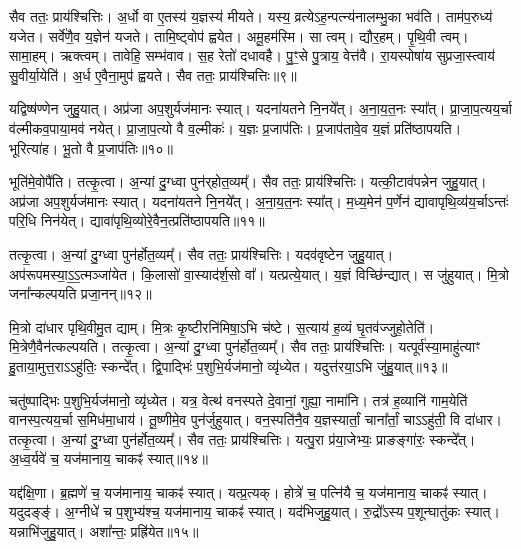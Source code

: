सैव ततः॒ प्राय॑श्चित्तिः।
अ॒र्धो वा ए॒तस्य॑ य॒ज्ञस्य॑ मीयते।
यस्य॒ व्रत्ये\-ऽह॒न्पत्न्य॑नालम्भु॒का भव॑ति।
ताम॑प॒रुध्य॑ यजेत।
सर्वे॑णै॒व य॒ज्ञेन॑ यजते।
तामि॒ष्ट्वोप॑ ह्वयेत।
अमू॒हम॑स्मि।
सा त्वम्।
द्यौर॒हम्।
पृ॒थि॒वी त्वम्।
सामा॒हम्।
ऋक्त्वम्।
तावेहि॒ सम्भ॑वाव।
स॒ह रेतो॑ दधावहै।
पु॒ꣳ॒से पु॒त्राय॒ वेत्त॑वै।
रा॒यस्पोषा॑य सुप्रजा॒स्त्वाय॑ सु॒वीर्या॒येति॑।
अ॒र्ध ए॒वैना॒मुप॑ ह्वयते।
सैव ततः॒ प्राय॑श्चित्तिः॥९॥\ip\anuvakamend[द॒धा॒ति॒ य॒ज्ञ उ॑त॒ एक॒न्धय॑न्ति रुन्धे कुर्यादा॒र्च्छत्य॒पाकु॑र्यात्पृथि॒वी त्वम॒ष्टौ च॑ (सर्वा॒न्॒ वि वै यदि॑ परस्त॒रामोष॑धीरन्यत॒रानु॒भया॑न॒र्धो वै॥)]

यद्विष्ष॑ण्णेन जुहु॒यात्।
अप्र॑जा अप॒शुर्यज॑मानः स्यात्।
यदना॑यतने नि॒नये᳚त्।
अ॒ना॒य॒त॒नः स्या᳚त्।
प्रा॒जा॒प॒त्यय॒र्चा व॑ल्मीकव॒पाया॒मव॑ नयेत्।
प्रा॒जा॒प॒त्यो वै व॒ल्मीकः॑।
य॒ज्ञः प्र॒जा\-प॑तिः।
प्र॒जा\-प॑तावे॒व य॒ज्ञं प्रति॑\-ष्ठापयति।
भूरित्या॑ह।
भू॒तो वै प्र॒जा\-प॑तिः॥१०॥\ip

भूति॑मे॒वोपै॑ति।
तत्कृ॒त्वा।
अ॒न्यां दु॒ग्ध्वा पुन॑र्‌\mbox{}होत॒व्यम्᳚।
सैव ततः॒ प्राय॑श्चित्तिः।
यत्की॒टाव॑पन्नेन जुहु॒यात्।
अप्र॑जा अप॒शुर्यज॑मानः स्यात्।
यदना॑यतने नि॒नये᳚त्।
अ॒ना॒य॒त॒नः स्या᳚त्।
म॒ध्य॒मेन॑ प॒र्णेन॑ द्यावापृथि॒व्य॑य॒र्चा\-ऽन्तः॑ परि॒धि निन॑येत्।
द्यावा॑पृथि॒व्योरे॒वैन॒त्प्रति॑\-ष्ठापयति॥११॥\ip

तत्कृ॒त्वा।
अ॒न्यां दु॒ग्ध्वा पुन॑र्\mbox{}होत॒व्यम्᳚।
सैव ततः॒ प्राय॑श्चित्तिः।
यदव॑वृष्टेन जुहु॒यात्।
अप॑रूपमस्या॒ऽ॒ऽ॒त्मञ्जा॑येत।
कि॒लासो॑ वा॒स्याद॑र्\mbox{}श॒सो वा᳚।
यत्प्रत्ये॒यात्।
य॒ज्ञं वि\-च्छि॑न्द्यात्।
स जु॑हुयात्।
मि॒त्रो जना᳚न्कल्पयति प्रजा॒नन्॥१२॥\ip

मि॒त्रो दा॑धार पृथि॒वीमु॒त द्याम्।
मि॒त्रः कृ॒ष्टीरनि॑मिषा॒ऽभि च॑ष्टे।
स॒त्याय॑ ह॒व्यं घृ॒तव॑ज्जुहो॒तेति॑।
मि॒त्रेणै॒वैन॑त्कल्पयति।
तत्कृ॒त्वा।
अ॒न्यां दु॒ग्ध्वा पुन॑र्\mbox{}होत॒व्यम्᳚।
सैव ततः॒ प्राय॑श्चित्तिः।
यत्पूर्व॑स्या॒माहु॑त्याꣳ हु॒ताया॒मुत्त॒रा\-ऽऽहु॑तिः॒ स्कन्दे᳚त्।
द्वि॒पाद्भिः॑ प॒शुभि॒र्यज॑मानो॒ व्यृ॑ध्येत।
यदुत्त॑रया॒ऽभि जु॑हु॒यात्॥१३॥\ip

चतु॑ष्पाद्भिः प॒शुभि॒र्यज॑मानो॒ व्यृ॑ध्येत।
यत्र॒ वेत्थ॑ वनस्पते दे॒वानां॒ गुह्या॒ नामा॑नि।
तत्र॑ ह॒व्यानि॑ गाम॒येति॑ वानस्प॒त्यय॒र्चा स॒मिध॑मा॒धाय॑।
तू॒ष्णीमे॒व पुन॑र्जुहुयात्।
वन॒स्पति॑नै॒व य॒ज्ञस्यार्तां॒ चाना᳚र्तां॒ चाऽऽहु॑ती॒ वि दा॑धार।
तत्कृ॒त्वा।
अ॒न्यां दु॒ग्ध्वा पुन॑र्\mbox{}होत॒व्यम्᳚।
सैव ततः॒ प्राय॑श्चित्तिः।
यत्पु॒रा प्र॑या॒जेभ्यः॒ प्राङङ्गा॑रः॒ स्कन्दे᳚त्।
अ॒ध्व॒र्यवे॑ च॒ यज॑मानाय॒ चाकꣴ॑ स्यात्॥१४॥\ip

यद्द॑क्षि॒णा।
ब्र॒ह्मणे॑ च॒ यज॑मानाय॒ चाकꣴ॑ स्यात्।
यत्प्र॒त्यक्।
होत्रे॑ च॒ पत्नि॑यै च॒ यज॑मानाय॒ चाकꣴ॑ स्यात्।
यदुदङ्ङ्॑।
अ॒ग्नीधे॑ च प॒शुभ्य॑श्च॒ यज॑मानाय॒ चाकꣴ॑ स्यात्।
यद॑भिजुहु॒यात्।
रु॒द्रो᳚ऽस्य प॒शून्घातु॑कः स्यात्।
यन्नाभि॑जुहु॒यात्।
अशा᳚न्तः॒ प्रह्रि॑येत॥१५॥\ip

